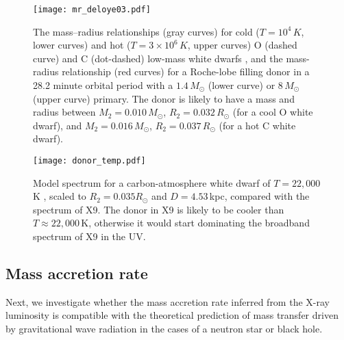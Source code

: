 \documentclass[a4paper,fleqn,usenatbib]{mnras}
\begin{document}
\begin{figure}
	\texttt{[image: mr\_deloye03.pdf]}
	\caption{The mass--radius relationships (gray curves) for cold ($T=10^4\,K$, lower curves) and hot ($T=3 \times 10^6\,K$, upper curves) O (dashed curve) and C (dot-dashed) low-mass white dwarfs \citep{2003ApJ...598.1217D}, and the mass-radius relationship (red curves) for a Roche-lobe filling donor in a 28.2 minute orbital period with a $1.4\,M_\odot$ (lower curve) or $8\,M_\odot$ (upper curve) primary. The donor is likely to have a mass and radius between $M_2 = 0.010\,M_\odot$, $R_2 = 0.032\,R_\odot$ (for a cool O white dwarf), and $M_2 = 0.016 \,M_\odot$, $R_2 = 0.037\,R_\odot$ (for a hot C white dwarf).}
	\label{fig:mr_wd}
\end{figure}

\begin{figure}
	\texttt{[image: donor\_temp.pdf]}
	\caption{Model spectrum for a carbon-atmosphere white dwarf of $T = 22,000$\,K \citep{2008ApJ...683..978D}, scaled to $R_{2} = 0.035 R_\odot$ and $D = 4.53$\,kpc, compared with the spectrum of X9. The donor in X9 is likely to be cooler than $T \approx 22,000$\,K, otherwise it would start dominating the broadband spectrum of X9 in the UV.}
	\label{fig:temp_wd}
\end{figure}

\subsection{Mass accretion rate}
\label{sec:mdot}

Next, we investigate whether the mass accretion rate inferred from the X-ray luminosity is compatible with the theoretical prediction of mass transfer driven by gravitational wave radiation in the cases of a neutron star or black hole.
\end{document}
